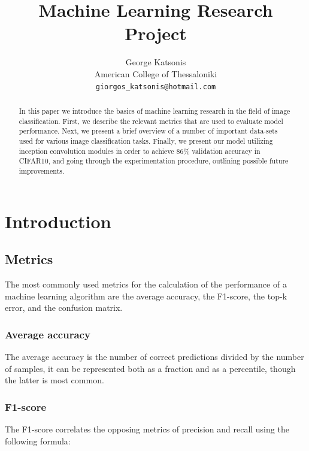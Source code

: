 \documentclass[10pt,twocolumn,letterpaper]{article}
\begin{document}
\title{Machine Learning Research Project}

\author{George Katsonis\\
American College of Thessaloniki\\
{\tt\small giorgos\_katsonis@hotmail.com}
}

\maketitle

\begin{abstract}
   In this paper we introduce the basics of machine learning research in the field of image classification. First, we describe the relevant metrics that are used to evaluate model performance. Next, we present a brief overview of a number of important data-sets used for various image classification tasks. Finally, we present our model utilizing inception convolution modules in order to achieve 86\% validation accuracy in CIFAR10, and going through the experimentation procedure, outlining possible future improvements.
\end{abstract}

\section{Introduction}
\subsection{Metrics}
The most commonly used metrics for the calculation of the performance of a machine learning algorithm are the average accuracy, the F1-score, the top-k error, and the confusion matrix. \cite{iba_deep_2020}

\subsubsection{Average accuracy}
 The average accuracy is the number of correct predictions divided by the number of samples, it can be represented both as a fraction and as a percentile, though the latter is most common.
 
\subsubsection{F1-score}
The F1-score correlates the opposing metrics of precision and recall using the following formula:
\end{document}
